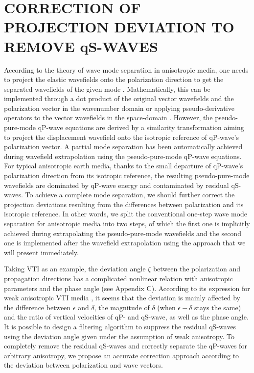 \section{CORRECTION OF PROJECTION DEVIATION TO REMOVE qS-WAVES}

According to the theory of wave mode separation in anisotropic media,
 one needs to project the elastic wavefields onto the polarization 
direction to get the separated wavefields of the given mode \cite[]{dellinger.etgen:1990}.
Mathematically, this can be implemented through a dot product of the original vector wavefields
 and the polarization vector in the wavenumber domain  \cite[]{dellinger.etgen:1990}
or applying pseudo-derivative operators
 to the vector wavefields in the space-domain \cite[]{yan.sava:2009}. 
 However, the pseudo-pure-mode qP-wave equations are derived by a similarity transformation
aiming to project the displacement wavefield onto the isotropic reference of
 qP-wave's polarization vector. A partial mode separation
 has been automatically achieved during wavefield extrapolation using the pseudo-pure-mode qP-wave equations.
For typical anisotropic earth media, thanks to the small departure of qP-wave's polarization
	direction from its isotropic reference,
	the resulting pseudo-pure-mode wavefields are dominated by qP-wave energy and contaminated by residual qS-waves.
To achieve a complete mode separation, we should further correct the projection 
deviations resulting from the differences between polarization and its isotropic reference.
In other words, we split the conventional one-step wave mode separation for anisotropic media
\cite[]{dellinger.etgen:1990,yan.sava:2009} into two steps, of which the first one is implicitly achieved
during extrapolating the pseudo-pure-mode wavefields and the second one is implemented after the wavefield
extrapolation using the approach that we will present immediately. 

 Taking VTI as an example, the deviation angle $\zeta$ between the polarization and 
propagation directions has a complicated nonlinear relation
 with anisotropic parameters and the phase angle (see Appendix C).
According to its expression for weak anisotropic VTI media
 \cite[]{rommel:1994,tsvankin:2001}, it seems that the deviation is mainly affected
 by the difference between $\epsilon$ and $\delta$,  the magnitude of $\delta$ (when 
$\epsilon-\delta$ stays the same) and the ratio of vertical velocities of qP- and qS-wave,
 as well as the phase angle.
It is possible to design a filtering algorithm 
to suppress the residual qS-waves using the deviation angle given under the assumption of weak anisotropy. 
To completely remove the residual qS-waves and correctly separate the qP-waves for arbitrary anisotropy, we 
propose an accurate correction approach according to the deviation between polarization and wave vectors.

